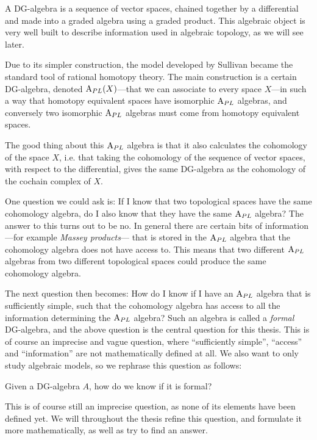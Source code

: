 A DG-algebra is a sequence of vector spaces, chained together by a differential and made into a graded algebra using a graded product. This algebraic object is very well built to describe information used in algebraic topology, as we will see later. 

Due to its simpler construction, the model developed by Sullivan became the standard tool of rational homotopy theory. The main construction is a certain DG-algebra, denoted $\text{A}_{PL}(X)$---that we can associate to every space $X$---in such a way that homotopy equivalent spaces have isomorphic $\text{A}_{PL}$ algebras, and conversely two isomorphic $\text{A}_{PL}$ algebras must come from homotopy equivalent spaces.


The good thing about this $\text{A}_{PL}$ algebra is that it also calculates the cohomology of the space $X$, i.e. that taking the cohomology of the sequence of vector spaces, with respect to the differential, gives the same DG-algebra as the cohomology of the cochain complex of $X$. 

One question we could ask is: If I know that two topological spaces have the same cohomology algebra, do I also know that they have the same $\text{A}_{PL}$ algebra? The answer to this turns out to be no. In general there are certain bits of information---for example \emph{Massey products}--- that is stored in the $\text{A}_{PL}$ algebra that the cohomology algebra does not have access to. This means that two different $\text{A}_{PL}$ algebras from two different topological spaces could produce the same cohomology algebra.

The next question then becomes: How do I know if I have an $\text{A}_{PL}$ algebra that is sufficiently simple, such that the cohomology algebra has access to all the information determining the $\text{A}_{PL}$ algebra? Such an algebra is called a \emph{formal} DG-algebra, and the above question is the central question for this thesis. This is of course an imprecise and vague question, where ``sufficiently simple'', ``access'' and ``information'' are not mathematically defined at all. We also want to only study algebraic models, so we rephrase this question as follows: 

\begin{central}
Given a DG-algebra $A$, how do we know if it is formal?
\end{central}

This is of course still an imprecise question, as none of its elements have been defined yet. We will throughout the thesis refine this question, and formulate it more mathematically, as well as try to find an answer. 

